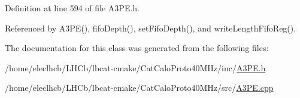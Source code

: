 Definition at line 594 of file A3\+P\+E.\+h.



Referenced by A3\+P\+E(), fifo\+Depth(), set\+Fifo\+Depth(), and write\+Length\+Fifo\+Reg().



The documentation for this class was generated from the following files\+:\begin{DoxyCompactItemize}
\item 
/home/eleclhcb/\+L\+H\+Cb/lbcat-\/cmake/\+Cat\+Calo\+Proto40\+M\+Hz/inc/\hyperlink{A3PE_8h}{A3\+P\+E.\+h}\item 
/home/eleclhcb/\+L\+H\+Cb/lbcat-\/cmake/\+Cat\+Calo\+Proto40\+M\+Hz/src/\hyperlink{A3PE_8cpp}{A3\+P\+E.\+cpp}\end{DoxyCompactItemize}
